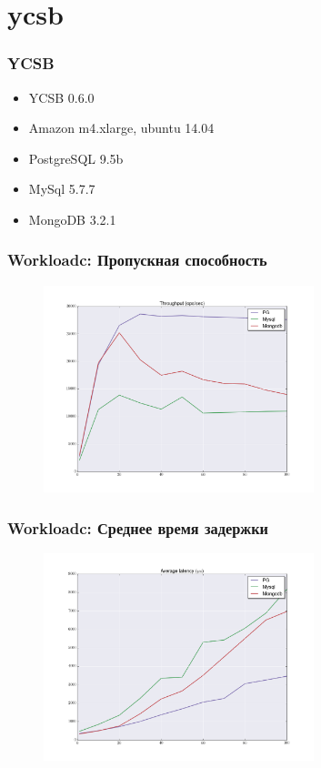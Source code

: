 \documentclass[14pt, compress, aspectratio=169]{beamer}
\begin{document}
\section{ycsb}

\begin{frame}[fragile]
    \frametitle{YCSB}
    \begin{itemize}[label={\MVRightarrow}]
        \item YCSB 0.6.0
        \item Amazon m4.xlarge, ubuntu 14.04
        \item PostgreSQL 9.5b
        \item MySql 5.7.7
        \item MongoDB 3.2.1
    \end{itemize}

\end{frame}

\begin{frame}[fragile]
    \frametitle{Workloadc: Пропускная способность}
    \vspace{-35pt}
    \begin{figure}
        \includegraphics[width=0.7\textwidth,center]{throughput.png}
    \end{figure}
\end{frame}

\begin{frame}[fragile]
    \frametitle{Workloadc: Среднее время задержки}
    \vspace{-35pt}
    \begin{figure}
        \includegraphics[width=0.7\textwidth,center]{average_latency.png}
    \end{figure}
\end{frame}
\end{document}
